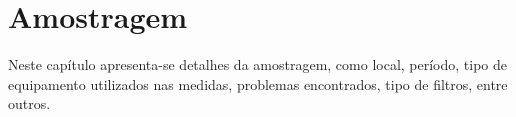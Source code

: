 \chapter{Amostragem}

Neste capítulo apresenta-se detalhes da amostragem, como local, período, 
tipo de equipamento utilizados nas medidas, problemas encontrados,
tipo de filtros, entre outros. 


